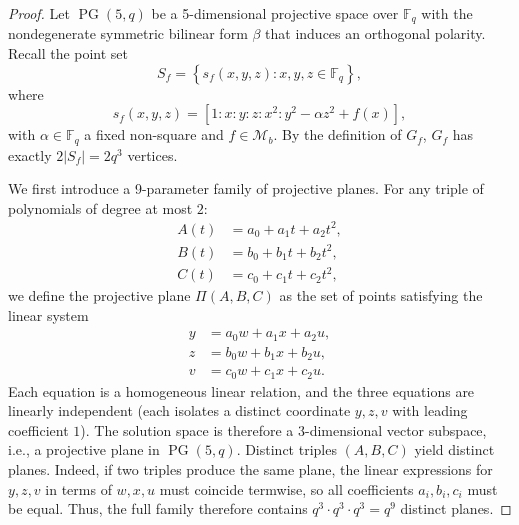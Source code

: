 \documentclass[10pt,a4paper]{amsart}
\newcommand{\PG}{\operatorname{PG}}
\begin{document}
\begin{proof}
Let $\PG(5,q)$ be a 5-dimensional projective space  over $\mathbb{F}_q$  with the nondegenerate symmetric bilinear form $\beta$ that induces an orthogonal polarity. Recall the point set
\[
S_f = \left\{ s_f(x, y, z) : x, y, z \in \mathbb{F}_q \right\},
\]
where 
\[
s_f(x, y, z) = \left[ 1 : x : y : z : x^2 : y^2 - \alpha z^2 + f(x) \right],
\]
with $\alpha \in \mathbb{F}_q$ a fixed non-square and $f \in \mathcal{M}_b$. By the definition of  $G_f$, $G_f$ has exactly $2|S_f| = 2q^3$ vertices.

We first introduce a 9-parameter family of projective planes. 
For any triple of polynomials of degree at most $2$:
\[
\begin{aligned}
A(t) &= a_0 + a_1 t + a_2 t^2, \\
B(t) &= b_0 + b_1 t + b_2 t^2, \\
C(t) &= c_0 + c_1 t + c_2 t^2,
\end{aligned}
\]
we define the projective plane $\Pi(A,B,C)$ as the set of points satisfying the linear system
\[
\begin{aligned}\label{exKabK3b+1-equation7}
y &= a_0 w + a_1 x + a_2 u, \\
z &= b_0 w + b_1 x + b_2 u, \\
v &= c_0 w + c_1 x + c_2 u.
\end{aligned}
\]
Each equation is a homogeneous linear relation, and the three equations are linearly independent (each isolates a distinct coordinate $y,z,v$ with leading coefficient $1$). The solution space is therefore a $3$-dimensional vector subspace, i.e., a projective plane in $\PG(5,q)$.
Distinct triples $(A,B,C)$ yield distinct planes. Indeed, if two triples produce the same plane, the linear expressions for $y,z,v$ in terms of $w,x,u$ must coincide termwise, so all coefficients $a_i,b_i,c_i$ must be equal. Thus, the full family therefore contains $q^3 \cdot q^3 \cdot q^3 = q^9$ distinct planes.




\end{proof}
\end{document}

